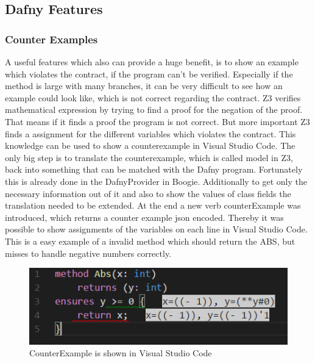 \subsection{Dafny Features}

\subsubsection{Counter Examples}
A useful features which also can provide a huge benefit, is to show an example which violates the contract, if the program can't be verified. Especially if the method is large with many branches, it can be very difficult to see how an example could look like, which is not correct regarding the contract. \newline
Z3 verifies mathematical expression by trying to find a proof for the negation of the proof. That means if it finds a proof the program is not correct. But more important Z3 finds a assignment for the different variables which violates the contract. This knowledge can be used to show a counterexample in Visual Studio Code. The only big step is to translate the counterexample, which is called model in Z3, back into something that can be matched with the Dafny program. Fortunately this is already done in the DafnyProvider in Boogie. Additionally to get only the necessary information out of it and also to show the values of class fields the translation needed to be extended. At the end a new verb counterExample was introduced, which returns a counter example json encoded. Thereby it was possible to show assignments of the variables on each line in Visual Studio Code. \newline
This is a easy example of a invalid method which should return the ABS, but misses to handle negative numbers correctly. 
\begin{figure}[H]
	\centering
	\includegraphics[width=1\textwidth]{img/counterModel}
	\caption{CounterExample is shown in Visual Studio Code}
	\label{fig:counterModel}
\end{figure}

